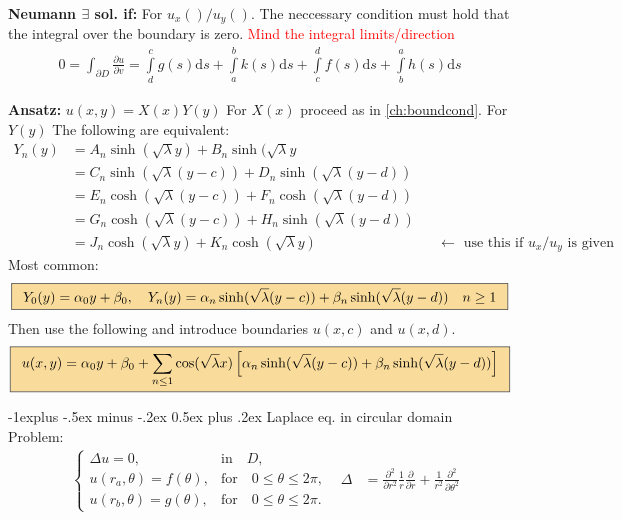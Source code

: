 \documentclass[10pt,landscape]{scrartcl}
\makeatletter
\renewcommand{\subsection}{\@startsection{subsection}{2}{0mm}%
                                {-1explus -.5ex minus -.2ex}%
                                {0.5ex plus .2ex}%
                                {\normalfont\normalsize\bfseries}}
\newcommand{\eqbox}[1]{\fcolorbox{black}{formula}{\hspace{0.5em}$\displaystyle#1$\hspace{0.5em}}}
\newcommand{\Int}{\int\limits}
\newcommand\warning{%
 \makebox[1.4em][c]{%
 \makebox[0pt][c]{\raisebox{.1em}{\small!}}%
 \makebox[0pt][c]{\color{red}\Large$\bigtriangleup$}}}%
\makeatother
\begin{document}
\begin{multicols*}{2}
\textbf{Neumann $\exists$ sol. if:} For $u_x()/u_y()$. The neccessary condition must hold that the integral over the boundary is zero. \warning\textcolor{red}{Mind the integral limits/direction}
  \begin{align*}
      0 = \int_{\partial D} \frac{\partial u}{\partial v} = 
      \Int^c_dg(s)\mathrm{d}s+ \Int^b_ak(s)\mathrm{d}s+\Int^d_cf(s)\mathrm{d}s+ \Int^a_bh(s)\mathrm{d}s
  \end{align*}

\textbf{Ansatz:} $u(x,y)=X(x)Y(y)$ For $X(x)$ proceed as in \ref{ch:boundcond}. For $Y(y)$ The following are equivalent:
  \begin{align*}
    Y_n(y) &= A_n \sinh(\sqrt{\lambda}y) + B_n \sinh(\sqrt{\lambda}y & &\\
           &= C_n \sinh(\sqrt{\lambda}(y-c)) + D_n \sinh(\sqrt{\lambda}(y-d)) & &\\
           &= E_n \cosh(\sqrt{\lambda}(y-c)) + F_n \cosh(\sqrt{\lambda}(y-d)) & &\\
           &= G_n \cosh(\sqrt{\lambda}(y-c)) + H_n \sinh(\sqrt{\lambda}(y-d)) & &\\
           &= J_n \cosh(\sqrt{\lambda}y) + K_n \cosh(\sqrt{\lambda}y) & &\leftarrow\text{ use this if $u_x/u_y$ is given}
  \end{align*}
Most common:
\begin{align*}
  \eqbox{Y_0(y) = \alpha_0y+\beta_0, \quad Y_n(y) = \alpha_n \sinh(\sqrt{\lambda}(y-c)) + \beta_n \sinh(\sqrt{\lambda}(y-d)) \quad n \geq 1}
\end{align*}
Then use the following and introduce boundaries $u(x,c)$ and $u(x,d)$.
\begin{align*}
  \eqbox{u(x,y) = \alpha_0y+\beta_0+\sum_{n\leq1}\cos(\sqrt{\lambda}x)\left[\alpha_n\sinh(\sqrt{\lambda}(y-c))+\beta_n\sinh(\sqrt{\lambda}(y-d))\right]}
\end{align*}

\subsection{Laplace eq. in circular domain}
  Problem:
  \begin{align*}
    &\begin{cases}
      \Delta u = 0, & \text{in} \quad D,\\
      u(r_a,\theta) = f(\theta), & \text{for} \quad 0 \leq \theta \leq 2\pi,\\
      u(r_b,\theta) = g(\theta), & \text{for} \quad 0 \leq \theta \leq 2\pi.
    \end{cases}
    &
    \Delta &= \frac{\partial^2}{\partial r^2} \frac{1}{r}\frac{\partial}{\partial r} + \frac{1}{r^2} \frac{\partial^2}{\partial \theta^2}
  \end{align*}


\end{multicols*}
\end{document}
